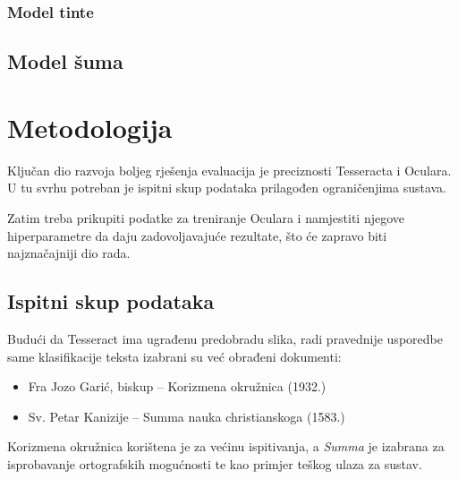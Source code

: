 \documentclass[zavrsnirad]{fer}
\begin{document}
\subsection{Model tinte}



\section{Model šuma}











\chapter{Metodologija}
\label{pog:metodologija}

Ključan dio razvoja boljeg rješenja evaluacija je preciznosti Tesseracta i Oculara. U tu svrhu potreban je ispitni skup podataka prilagođen ograničenjima sustava. 

Zatim treba prikupiti podatke za treniranje Oculara i namjestiti njegove hiperparametre da daju zadovoljavajuće rezultate, što će zapravo biti najznačajniji dio rada.


\section{Ispitni skup podataka}

Budući da Tesseract ima ugrađenu predobradu slika, radi pravednije usporedbe same klasifikacije teksta izabrani su već obrađeni dokumenti:

\begin{itemize}
	\item Fra Jozo Garić, biskup – Korizmena okružnica (1932.)
	\item Sv. Petar Kanizije – Summa nauka christianskoga (1583.)
\end{itemize}

Korizmena okružnica korištena je za većinu ispitivanja, a \textit{Summa} je izabrana za isprobavanje ortografskih mogućnosti te kao primjer teškog ulaza za sustav.
\end{document}
